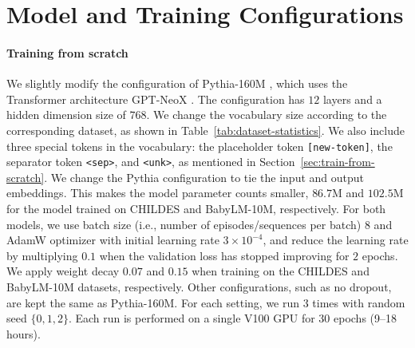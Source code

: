 \documentclass{article}
\begin{document}
\begin{table*}[t]
\begin{center}
\begin{tabular}{cc|ccc|ccc}
\bottomrule
\end{tabular}
\end{center}
\caption{Dataset statistics. All statistics are based on tokens, which mostly correspond to words except punctuations due to our word-level tokenization. ``unk rate'' is the percentage of out-of-vocabulary tokens, which are replaced by \texttt{<unk>}, in all tokens. Unk rate is slightly higher in the validation and test portions than the training portion because we build the vocabulary from the training portion. As shown by the mean sentence lengths, the meta-learning sentences are longer on average than the language modeling sentences, since meta-learned words are of lower frequency and thus are usually in more complex sentences. We manually tune the two thresholds of meta-learned words so we have enough number of meta-learned words while the unk rate is not too high.}
\label{tab:dataset-statistics}
\end{table*}

\clearpage\clearpage
\section{Model and Training Configurations}
\label{app:model}
\paragraph{Training from scratch}
We slightly modify the configuration of \mbox{Pythia-160M} \citep{Pythia}, which uses the Transformer architecture GPT-NeoX \citep{GPT-NeoX}. The configuration has $12$ layers and a hidden dimension size of $768$.
We change the vocabulary size according to the corresponding dataset, as shown in Table~\ref{tab:dataset-statistics}.
We also include three special tokens in the vocabulary: the placeholder token \texttt{[new-token]}, the separator token \texttt{<sep>}, and \texttt{<unk>}, as mentioned in Section~\ref{sec:train-from-scratch}.
We change the Pythia configuration to tie the input and output embeddings. This makes the model parameter counts smaller, $86.7$M and $102.5$M for the model trained on CHILDES and BabyLM-10M, respectively.
For both models, we use batch size (i.e., number of episodes/sequences per batch) $8$ and AdamW optimizer \citep{Loshchilov2019} with initial learning rate $3 \times 10^{-4}$, and reduce the learning rate by multiplying $0.1$ when the validation loss has stopped improving for $2$ epochs. We apply weight decay $0.07$ and $0.15$ when training on the CHILDES and BabyLM-10M datasets, respectively. Other configurations, such as no dropout, are kept the same as \mbox{Pythia-160M}.
For each setting, we run $3$ times with random seed $\{0, 1, 2\}$.
Each run is performed on a single V100 GPU for 30 epochs (9--18 hours).
\end{document}
